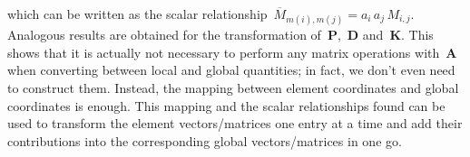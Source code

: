 which can be written as the scalar relationship~$\overline{M}_{m(i),m(j)} = a_{i}\,a_{j}\,M_{i,j}$.
Analogous results are obtained for the transformation of~$\boldsymbol{P}$,~$\boldsymbol{D}$ and~$\boldsymbol{K}$.
This shows that it is actually not necessary to perform any matrix operations with~$\boldsymbol{A}$ when converting between local and global quantities; in fact, we don't even need to construct them.
Instead, the mapping between element coordinates and global coordinates is enough.
This mapping and the scalar relationships found can be used to transform the element vectors/matrices one entry at a time and add their contributions into the corresponding global vectors/matrices in one go.

%
%
%
%
%
%
%
%
%
%
%
